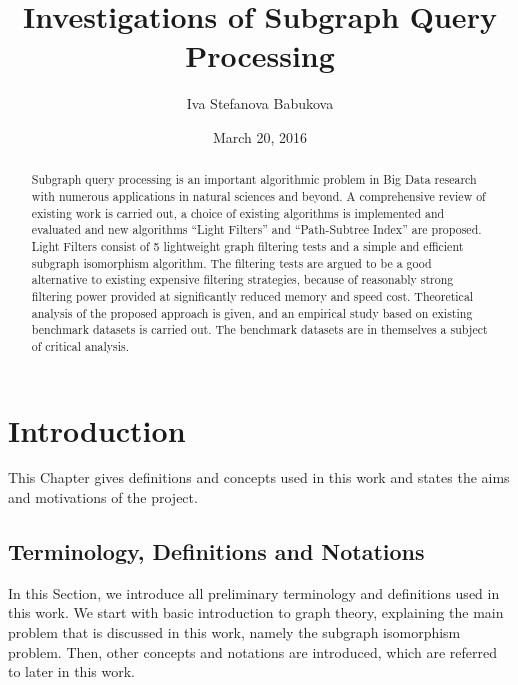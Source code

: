 \documentclass{l4proj}
\begin{document}
\title{Investigations of Subgraph Query Processing}
\author{Iva Stefanova Babukova}
\date{March 20, 2016}
\maketitle

\begin{abstract}

Subgraph query processing is an important algorithmic problem in Big Data research with numerous applications in natural sciences and beyond. A comprehensive review of existing work is carried out, a choice of existing algorithms is implemented and evaluated and new algorithms ``Light Filters'' and ``Path-Subtree Index'' are proposed. Light Filters consist of 5 lightweight graph filtering tests and a simple and efficient subgraph isomorphism algorithm. The filtering tests are argued to be a good alternative to existing expensive filtering strategies, because of reasonably strong filtering power provided at significantly reduced memory and speed cost. Theoretical analysis of the proposed approach is given, and an empirical study based on existing benchmark datasets is carried out. The benchmark datasets are in themselves a subject of critical analysis.

\end{abstract}

\educationalconsent
%
%
\tableofcontents
\chapter{Introduction}
\label{ch:introduction}

This Chapter gives definitions and concepts used in this work and states the aims and motivations of the project. 

\section{Terminology, Definitions and Notations}
\label{sec:theory}
In this Section, we introduce all preliminary terminology and definitions used in this work. We start with basic introduction to graph theory, explaining the main problem that is discussed in this work, namely the subgraph isomorphism problem. Then, other concepts and notations are introduced, which are referred to later in this work.
\end{document}
